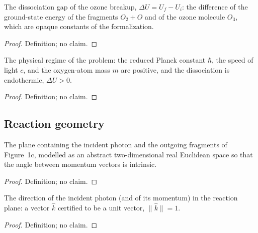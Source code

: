 \begin{definition}
\label{def:IPhO2026Problems_problem_IPhO_2026_1_C_1:dissociationEnergyGap}
The dissociation gap of the ozone breakup, $\Delta U = U_f - U_i$: the
difference of the ground-state energy of the fragments $O_2 + O$ and of
the ozone molecule $O_3$, which are opaque constants of the formalization.
\end{definition}
\begin{proof}
Definition; no claim.
\end{proof}

\begin{definition}
\label{def:IPhO2026Problems_problem_IPhO_2026_1_C_1:ConstantRegime}
The physical regime of the problem: the reduced Planck constant $\hbar$,
the speed of light $c$, and the oxygen-atom mass $m$ are positive, and the
dissociation is endothermic, $\Delta U > 0$.
\end{definition}
\begin{proof}
Definition; no claim.
\end{proof}

\subsection*{Reaction geometry}

\begin{definition}
\label{def:IPhO2026Problems_problem_IPhO_2026_1_C_1:ReactionPlane}
The plane containing the incident photon and the outgoing fragments of
Figure~1c, modelled as an abstract two-dimensional real Euclidean space so
that the angle between momentum vectors is intrinsic.
\end{definition}
\begin{proof}
Definition; no claim.
\end{proof}

\begin{definition}
\label{def:IPhO2026Problems_problem_IPhO_2026_1_C_1:PhotonLine}
The direction of the incident photon (and of its momentum) in the reaction
plane: a vector $\hat{k}$ certified to be a unit vector,
$\|\hat{k}\| = 1$.
\end{definition}
\begin{proof}
Definition; no claim.
\end{proof}

